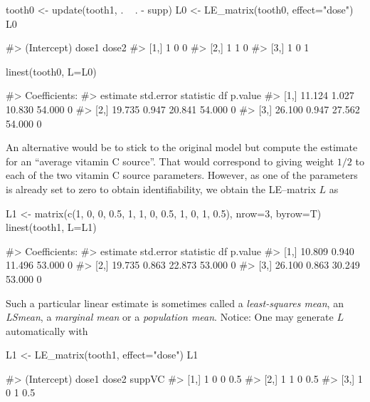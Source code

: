 \begin{Schunk}
\begin{Sinput}
tooth0 <- update(tooth1, . ~ . - supp)
L0 <- LE_matrix(tooth0, effect="dose")
L0
\end{Sinput}
\begin{Soutput}
#>      (Intercept) dose1 dose2
#> [1,]           1     0     0
#> [2,]           1     1     0
#> [3,]           1     0     1
\end{Soutput}
\begin{Sinput}
linest(tooth0, L=L0)
\end{Sinput}
\begin{Soutput}
#> Coefficients:
#>      estimate std.error statistic     df p.value
#> [1,]   11.124     1.027    10.830 54.000       0
#> [2,]   19.735     0.947    20.841 54.000       0
#> [3,]   26.100     0.947    27.562 54.000       0
\end{Soutput}
\end{Schunk}

An alternative would be to stick to the original model but compute the
estimate for an ``average vitamin C source''. That would correspond to
giving weight \(1/2\) to each of the two vitamin C source parameters.
However, as one of the parameters is already set to zero to obtain
identifiability, we obtain the LE--matrix \(L\) as

\begin{Schunk}
\begin{Sinput}
L1 <- matrix(c(1, 0, 0, 0.5, 
               1, 1, 0, 0.5,
               1, 0, 1, 0.5), nrow=3, byrow=T)
linest(tooth1, L=L1)
\end{Sinput}
\begin{Soutput}
#> Coefficients:
#>      estimate std.error statistic     df p.value
#> [1,]   10.809     0.940    11.496 53.000       0
#> [2,]   19.735     0.863    22.873 53.000       0
#> [3,]   26.100     0.863    30.249 53.000       0
\end{Soutput}
\end{Schunk}

Such a particular linear estimate is sometimes called a
\emph{least-squares mean}, an \emph{LSmean}, a \emph{marginal mean} or a
\emph{population mean}. Notice: One may generate \(L\) automatically
with

\begin{Schunk}
\begin{Sinput}
L1 <- LE_matrix(tooth1, effect="dose")
L1
\end{Sinput}
\begin{Soutput}
#>      (Intercept) dose1 dose2 suppVC
#> [1,]           1     0     0    0.5
#> [2,]           1     1     0    0.5
#> [3,]           1     0     1    0.5
\end{Soutput}
\end{Schunk}

